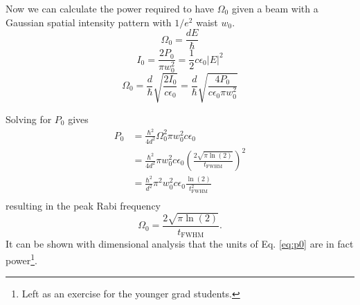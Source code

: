 
Now we can calculate the power required to have $\Omega_0$ given a beam with a Gaussian spatial intensity pattern with $1/e^2$ waist $w_0$. 
\begin{equation}
    \Omega_0=\frac{dE}{\hbar}
\end{equation}
\begin{equation}
    I_0=\frac{2P_0}{\pi w_0^2}=\frac{1}{2}c \epsilon_0|E|^2
\end{equation}
\begin{equation}
    \Omega_0 =\frac{d}{\hbar}\sqrt{\frac{2I_0}
{c\epsilon_0}}=\frac{d}{\hbar}\sqrt{\frac{4P_0}{c\epsilon_0 \pi w_0^2}}
\end{equation}

Solving for $P_0$ gives
\begin{equation}\label{eq:p0}
\begin{split}
P_0 & = \frac{\hbar^2}{4d^2}\Omega_0^2\pi w_0^2 c \epsilon_0 \\
 & = \frac{\hbar^2}{4d^2} \pi w_0^2 c \epsilon_0 \left(\frac{2\sqrt{\pi \ln(2)}}{t_{\textrm{FWHM}}}\right)^2 \\
 & = \frac{\hbar^2}{d^2} \pi^2 w_0^2 c \epsilon_0\frac{\ln(2)}{t_{\textrm{FWHM}}^2} \\
\end{split}
\end{equation}
resulting in the peak Rabi frequency
\begin{equation}\label{eq:omega0}
    \Omega_0=\frac{2\sqrt{\pi \ln(2)}}{t_{\textrm{FWHM}}}.
\end{equation}
It can be shown with dimensional analysis that the units of Eq. \ref{eq:p0} are in fact power\footnote{Left as an exercise for the younger grad students.}.

